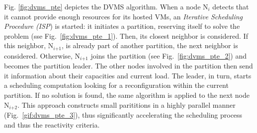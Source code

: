 Fig. \ref{fig:dvms_pte} depictes the DVMS algorithm.
When a node N\(_{\textit{i}}\) detects that it cannot provide enough
resources for its hosted VMs, %
an \emph{Iterative Scheduling Procedure
  (ISP}) is started:
%
it initiates a partition, reserving itself to solve the problem (sse
Fig.~\ref{fig:dvms_pte_1}).
Then, its
closest neighbor %
is considered.
%
If this neighbor, N\(_{\textit{i+1}}\),
is already part of another partition, the next neighbor is considered.
Otherwise, N\(_{\textit{i+1}}\)
joins the partition (see Fig.~\ref{fig:dvms_pte_2}) and becomes the
partition leader.
%
The other nodes involved in the partition then send it information about their
capacities and current load. The leader, in turn, starts a scheduling
computation looking for a reconfiguration within the current
partition. If no solution is found, the same algorithm is applied to
the next node N\(_{\textit{i+2}}\).
%
This approach constructs small parititions in a highly parallel
manner (Fig.~\ref{gif:dvms_pte_3}), thus significantly accelerating
the scheduling process and thus the reactivity criteria.




